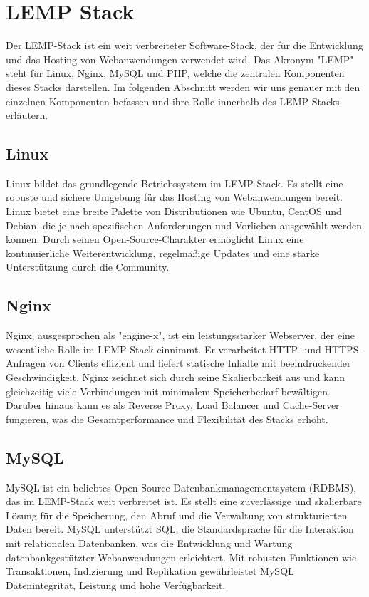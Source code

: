 \section{LEMP Stack}
Der LEMP-Stack ist ein weit verbreiteter Software-Stack, der für die Entwicklung und das Hosting von Webanwendungen verwendet wird. Das Akronym "LEMP" steht für Linux, Nginx, MySQL und PHP\cite{Radfelder2023a}, welche die zentralen Komponenten dieses Stacks darstellen. Im folgenden Abschnitt werden wir uns genauer mit den einzelnen Komponenten befassen und ihre Rolle innerhalb des LEMP-Stacks erläutern.
\subsection{Linux}
Linux bildet das grundlegende Betriebssystem im LEMP-Stack. Es stellt eine robuste und sichere Umgebung für das Hosting von Webanwendungen bereit. Linux bietet eine breite Palette von Distributionen wie Ubuntu, CentOS und Debian, die je nach spezifischen Anforderungen und Vorlieben ausgewählt werden können. Durch seinen Open-Source-Charakter ermöglicht Linux eine kontinuierliche Weiterentwicklung, regelmäßige Updates und eine starke Unterstützung durch die Community.
\subsection{Nginx}
Nginx, ausgesprochen als "engine-x", ist ein leistungsstarker Webserver, der eine wesentliche Rolle im LEMP-Stack einnimmt. Er verarbeitet HTTP- und HTTPS-Anfragen von Clients effizient und liefert statische Inhalte mit beeindruckender Geschwindigkeit. Nginx zeichnet sich durch seine Skalierbarkeit aus und kann gleichzeitig viele Verbindungen mit minimalem Speicherbedarf bewältigen. Darüber hinaus kann es als Reverse Proxy, Load Balancer und Cache-Server fungieren, was die Gesamtperformance und Flexibilität des Stacks erhöht.
\subsection{MySQL}
MySQL ist ein beliebtes Open-Source-Datenbankmanagementsystem (RDBMS), das im LEMP-Stack weit verbreitet ist. Es stellt eine zuverlässige und skalierbare Lösung für die Speicherung, den Abruf und die Verwaltung von strukturierten Daten bereit. MySQL unterstützt SQL, die Standardsprache für die Interaktion mit relationalen Datenbanken, was die Entwicklung und Wartung datenbankgestützter Webanwendungen erleichtert. Mit robusten Funktionen wie Transaktionen, Indizierung und Replikation gewährleistet MySQL Datenintegrität, Leistung und hohe Verfügbarkeit.
